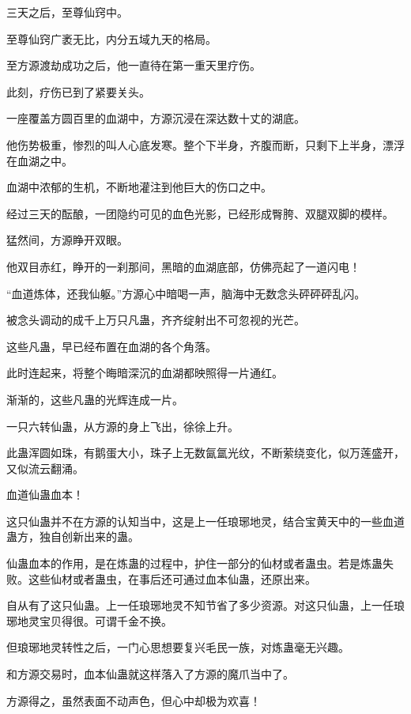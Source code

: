 
\begin{this_body}



三天之后，至尊仙窍中。

至尊仙窍广袤无比，内分五域九天的格局。

至方源渡劫成功之后，他一直待在第一重天里疗伤。

此刻，疗伤已到了紧要关头。

一座覆盖方圆百里的血湖中，方源沉浸在深达数十丈的湖底。

他伤势极重，惨烈的叫人心底发寒。整个下半身，齐腹而断，只剩下上半身，漂浮在血湖之中。

血湖中浓郁的生机，不断地灌注到他巨大的伤口之中。

经过三天的酝酿，一团隐约可见的血色光影，已经形成臀胯、双腿双脚的模样。

猛然间，方源睁开双眼。

他双目赤红，睁开的一刹那间，黑暗的血湖底部，仿佛亮起了一道闪电！

“血道炼体，还我仙躯。”方源心中暗喝一声，脑海中无数念头砰砰砰乱闪。

被念头调动的成千上万只凡蛊，齐齐绽射出不可忽视的光芒。

这些凡蛊，早已经布置在血湖的各个角落。

此时连起来，将整个晦暗深沉的血湖都映照得一片通红。

渐渐的，这些凡蛊的光辉连成一片。

一只六转仙蛊，从方源的身上飞出，徐徐上升。

此蛊浑圆如珠，有鹅蛋大小，珠子上无数氤氲光纹，不断萦绕变化，似万莲盛开，又似流云翻涌。

血道仙蛊血本！

这只仙蛊并不在方源的认知当中，这是上一任琅琊地灵，结合宝黄天中的一些血道蛊方，独自创新出来的蛊。

仙蛊血本的作用，是在炼蛊的过程中，护住一部分的仙材或者蛊虫。若是炼蛊失败。这些仙材或者蛊虫，在事后还可通过血本仙蛊，还原出来。

自从有了这只仙蛊。上一任琅琊地灵不知节省了多少资源。对这只仙蛊，上一任琅琊地灵宝贝得很。可谓千金不换。

但琅琊地灵转性之后，一门心思想要复兴毛民一族，对炼蛊毫无兴趣。

和方源交易时，血本仙蛊就这样落入了方源的魔爪当中了。

方源得之，虽然表面不动声色，但心中却极为欢喜！


\end{this_body}
